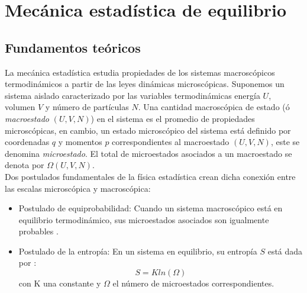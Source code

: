 % 
%
\chapter{Mecánica estadística de equilibrio}
\section{Fundamentos teóricos}
La mecánica estadística estudia propiedades de los sistemas macroscópicos termodinámicos a partir de las leyes dinámicas microscópicas. Suponemos un sistema aislado caracterizado por las variables termodinámicas energía $U$, volumen $V$ y número de partículas $N$. Una cantidad macroscópica de estado (ó {\it macroestado} $(U,V,N)$) en el sistema es el promedio de propiedades microscópicas, en cambio, un estado microscópico del sistema está definido por coordenadas $q$ y momentos $p$ correspondientes al macroestado $(U,V,N)$, este se denomina {\it microestado}. El total de microestados asociados a un macroestado se denota por $\Omega(U,V,N)$.\\


Dos postulados fundamentales de la física estadística crean dicha conexión entre las escalas microscópica y macroscópica:\\

\begin{itemize}
    \item Postulado de equiprobabilidad: Cuando un sistema macroscópico está en equilibrio termodinámico, sus microestados asociados son igualmente probables \cite{Huang_1987}.\\
    
    \item Postulado de la entropía: En un sistema en equilibrio, su entropía $S$ está dada por \cite{tuckerman2010}:
    \begin{equation}\label{postulado_entropia_boltx}
        S=Kln(\Omega)
    \end{equation}
    con K una constante y $\Omega$ el número de microestados correspondientes.
\end{itemize}


